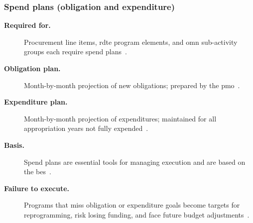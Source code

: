 \documentclass[../main.tex]{subfiles}
\begin{document}
\subsubsection{Spend plans (obligation and expenditure)}
\begin{description}
  \item[\textbf{Required for.}] Procurement line items, \ac{rdte} program elements, and \ac{omn} sub-activity groups each require spend plans~\autocite{edo-3-1-4-budget-execution-2025}.
  \item[\textbf{Obligation plan.}] Month-by-month projection of new obligations; prepared by the \ac{pmo}~\autocite{edo-3-1-4-budget-execution-2025}.
  \item[\textbf{Expenditure plan.}] Month-by-month projection of expenditures; maintained for all appropriation years not fully expended~\autocite{edo-3-1-4-budget-execution-2025}.
  \item[\textbf{Basis.}] Spend plans are essential tools for managing execution and are based on the \ac{bes}~\autocite{edo-3-1-4-budget-execution-2025}.
\end{description}

\begin{description}
  \item[\textbf{Failure to execute.}] Programs that miss obligation or expenditure goals become targets for reprogramming, risk losing funding, and face future budget adjustments~\autocite{edo-3-1-4-budget-execution-2025}.
\end{description}
\end{document}
